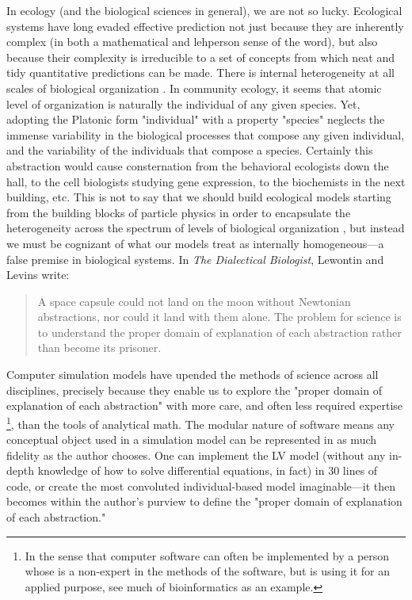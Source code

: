 \documentclass[]{article}
\begin{document}
In ecology (and the biological sciences in general), we are not so lucky.
Ecological systems have long evaded effective prediction not just because they are inherently complex (in both a mathematical and lehperson sense of the word), but also because their complexity is irreducible to a set of concepts from which neat and tidy quantitative predictions can be made.
There is internal heterogeneity at all scales of biological organization \citep{levins_dialectical_1987,levin_problem_1992}.
In community ecology, it seems that atomic level of organization is naturally the individual of any given species.
Yet, adopting the Platonic form "individual" with a property "species" neglects the immense variability in the biological processes that compose any given individual, and the variability of the individuals that compose a species.
Certainly this abstraction would cause consternation from the behavioral ecologists down the hall, to the cell biologists studying gene expression, to the biochemists in the next building, etc.
This is not to say that we should build ecological models starting from the building blocks of particle physics in order to encapsulate the heterogeneity across the spectrum of levels of biological organization \citep{levin_problem_1992}, but instead we must be cognizant of what our models treat as internally homogeneous---a false premise in biological systems.
In \emph{The Dialectical Biologist}, Lewontin and Levins write:

\begin{quote}
A space capsule could not land on the moon without Newtonian
abstractions, nor could it land with them alone. The problem for science
is to understand the proper domain of explanation of each abstraction
rather than become its prisoner. \citep{levin_problem_1992}
\end{quote}

Computer simulation models have upended the methods of science across all disciplines, precisely because they enable us to explore the
"proper domain of explanation of each abstraction" with more care, and often less required expertise
\footnote{In the sense that computer software can often be implemented by a person whose is a non-expert in the methods of the software, but is using it for an applied purpose, see much of bioinformatics as an example.}, than the tools of analytical math.
The modular nature of software means any conceptual object used in a simulation model can be represented in as much fidelity as the author chooses.
One can implement the LV model (without any in-depth knowledge of how to solve differential equations, in fact) in 30 lines of code, or create the most convoluted individual-based model imaginable---it then becomes within the author's purview to define the "proper domain of explanation of each abstraction."
\end{document}
